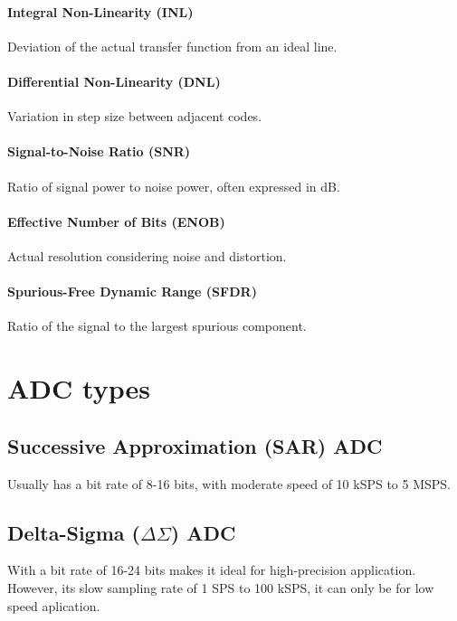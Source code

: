 \paragraph{Integral Non-Linearity (INL)} Deviation of the actual transfer function from an ideal line.

\paragraph{Differential Non-Linearity (DNL)} Variation in step size between adjacent codes.

\paragraph{Signal-to-Noise Ratio (SNR)} Ratio of signal power to noise power, often expressed in dB.

\paragraph{Effective Number of Bits (ENOB)} Actual resolution considering noise and distortion.

\paragraph{Spurious-Free Dynamic Range (SFDR)} Ratio of the signal to the largest spurious component.




\section{ADC types}
\subsection{Successive Approximation (SAR) ADC}
Usually has a bit rate of 8-16 bits, with moderate speed of 10 kSPS to 5 MSPS. 

\subsection{Delta-Sigma ($\Delta\Sigma$) ADC}
With a bit rate of 16-24 bits makes it ideal for high-precision application. However, its slow sampling rate of 1 SPS to 100 kSPS, it can only be for low speed aplication.


